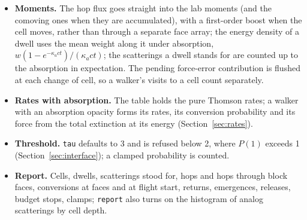 \documentclass[11pt]{article}
\newcommand{\key}[1]{\texttt{#1}}
\begin{document}
\begin{itemize}
  cell.  A walker whose cell is no longer a diffusion cell (a rebuilt lattice, or a
  block that disagrees with its neighbour's ghost) is released as an isotropic transport
  photon at the centre, counted.
\item \textbf{Moments.}  The hop flux goes straight into the lab moments (and the
  comoving ones when they are accumulated), with a first-order boost when the cell
  moves, rather than through a separate face array; the energy density of a dwell
  uses the mean weight along it under absorption, $w(1-e^{-\kappa_a ct})/(\kappa_a
  ct)$; the scatterings a dwell stands for are counted up to the absorption in
  expectation.  The pending force-error contribution is flushed at each change of
  cell, so a walker's visits to a cell count separately.
\item \textbf{Rates with absorption.}  The table holds the pure Thomson rates; a
  walker with an absorption opacity forms its rates, its conversion probability and
  its force from the total extinction at its energy (Section~\ref{sec:rates}).
\item \textbf{Threshold.}  \key{tau} defaults to 3 and is refused below 2, where
  $P(1)$ exceeds 1 (Section~\ref{sec:interface}); a clamped probability is counted.
\item \textbf{Report.}  Cells, dwells, scatterings stood for, hops and hops through
  block faces, conversions at faces and at flight start, returns, emergences, releases,
  budget stops, clamps; \key{report} also turns on the histogram of analog
  scatterings by cell depth.
\end{itemize}
\end{document}
